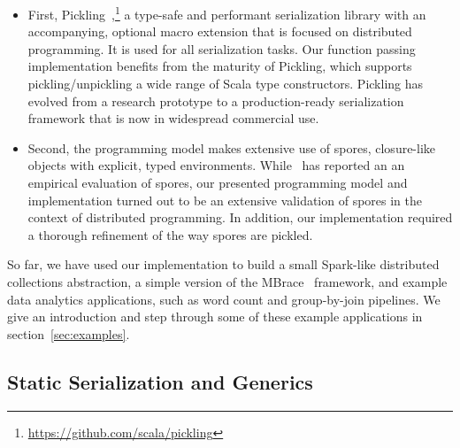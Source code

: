 \documentclass[10pt]{sigplanconf}
\theoremstyle{definition}
\theoremstyle{definition}
\begin{document}
\begin{itemize}

\item First, Pickling~\cite{Pickling},\footnote{\url{https://github.com/scala/pickling}}
  a type-safe and performant serialization library with an accompanying, optional
  macro extension that is focused on distributed programming. It is used for
  all serialization tasks. Our function passing implementation benefits from the maturity of
  Pickling, which supports pickling/unpickling a wide range of Scala type
  constructors. Pickling has evolved from a research prototype to a
  production-ready serialization framework that is now in widespread commercial
  use.

\item Second, the programming model makes extensive use of spores, closure-like
  objects with explicit, typed environments. While~\cite{Spores} has reported an
  an empirical evaluation of spores, our presented programming model and
  implementation turned out to be an extensive validation of spores in the context
  of distributed programming. In addition, our implementation required a thorough
  refinement of the way spores are pickled.

\end{itemize}

So far, we have used our implementation to build a small Spark-like distributed
collections abstraction, a simple version of the MBrace~\cite{MBrace} framework,
and example data analytics applications, such as word count and group-by-join
pipelines. We give an introduction and step through some of these example
applications in section~\ref{sec:examples}.



\subsection{Static Serialization and Generics}
\end{document}
